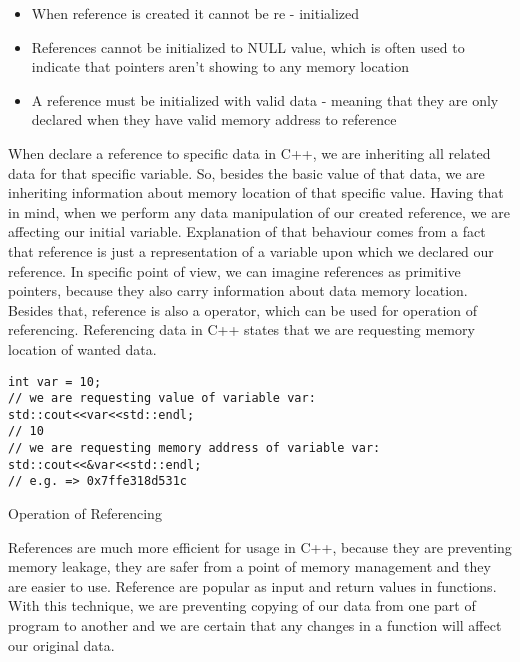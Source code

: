 \documentclass[11pt, a4paper]{article}
\begin{document}
\begin{itemize}
	\item When reference is created it cannot be re - initialized
	\item References cannot be initialized to NULL value, which is often used to indicate that pointers aren't showing to any memory location
  \item A reference must be initialized with valid data - meaning that they are only declared when they have valid memory address to reference
\end{itemize}



When declare a reference to specific data in C++, we are inheriting all related data for that specific variable. So, besides the basic value of that data, we are inheriting information about memory location of that specific value. Having that in mind, when we perform any data manipulation of our created reference, we are affecting our initial variable. Explanation of that behaviour comes from a fact that reference is just a representation of a variable upon which we declared our reference.
In specific point of view, we can imagine references as primitive pointers, because they also carry information about data memory location. Besides that, reference is also a operator, which can be used for operation of referencing. Referencing data in C++ states that we are requesting memory location of wanted data.




\begin{listing}
\begin{verbatim}
int var = 10;
// we are requesting value of variable var:
std::cout<<var<<std::endl;
// 10
// we are requesting memory address of variable var:
std::cout<<&var<<std::endl;
// e.g. => 0x7ffe318d531c
\end{verbatim}
\caption{Operation of Referencing}
\label{lst:operation_of_referencing}
\end{listing}



References are much more efficient for usage in C++, because they are preventing memory leakage, they are safer from a point of memory management and they are easier to use.
Reference are popular as input and return values in functions. With this technique, we are preventing copying of our data from one part of program to another and we are certain that any changes in a function will affect our original data.
\end{document}
